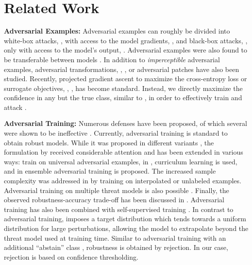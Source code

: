 \section{Related Work}
\label{sec:related-work}

\textbf{Adversarial Examples:}
%
Adversarial examples can roughly be divided into white-box attacks, \ie, with access to the model gradients, \eg \cite{GoodfellowICLR2015,MadryICLR2018,CarliniSP2017}, and black-box attacks, \ie, only with access to the model's output, \eg \cite{IlyasICML2018,NarodytskaCVPRWORK2017,AndriushchenkoARXIV2019}. Adversarial examples were also found to be transferable between models \cite{LiuICLR2017,XieCVPR2019}. In addition to \emph{imperceptible} adversarial examples, adversarial transformations, \eg,  \cite{EngstromICML2019,AlaifariICLR2019}, or adversarial patches \cite{BrownARXIV2017} have also been studied. Recently, projected gradient ascent to maximize the cross-entropy loss or surrogate objectives, \eg, \cite{MadryICLR2018,DongCVPR2018,CarliniSP2017}, has become standard. Instead, we directly maximize the confidence in any but the true class, similar to \cite{HeinCVPR2019,GoodfellowOPENREVIEW2019}, in order to effectively train and attack \ConfTrain.

\textbf{Adversarial Training:}
%
Numerous defenses have been proposed, of which several were shown to be ineffective \cite{AthalyeICML2018b,AthalyeARXIV2018b}. Currently, adversarial training is standard to obtain robust models. While it was proposed in different variants  \cite{SzegedyICLR2014,MiyatoICLR2016,HuangARXIV2015}, the formulation by \cite{MadryICLR2018} received considerable attention and has been extended in various ways: \cite{ShafahiAAAI2020,PielotARXIV2018} train on universal adversarial examples, in \cite{CaiIJCAI2018}, curriculum learning is used, and in \cite{TramerICLR2018,GrefenstetteARXIV2018} ensemble adversarial training is proposed. 
The increased sample complexity \cite{SchmidtNIPS2018} was addressed in \cite{LambAISEC2019,CarmonNIPS2019,UesatoNIPS2019} by training on interpolated or unlabeled examples. Adversarial training on multiple threat models is also possible \cite{TramerNIPS2019,MainiICML2020}. Finally, the observed robustness-accuracy trade-off has been discussed in \cite{TsiprasICLR2019,StutzCVPR2019,ZhangICML2019,RaghunathanARXIV2019}. Adversarial training has also been combined with self-supervised training \cite{HendrycksNIPS2019}. In contrast to adversarial training, \ConfTrain imposes a target distribution which tends towards a uniform distribution for large perturbations, allowing the model
to extrapolate beyond the threat model used at training time. Similar to adversarial training with an additional ``abstain'' class \cite{LaidlawARXIV2019}, robustness is obtained by rejection. In our case, rejection is based on confidence thresholding.

